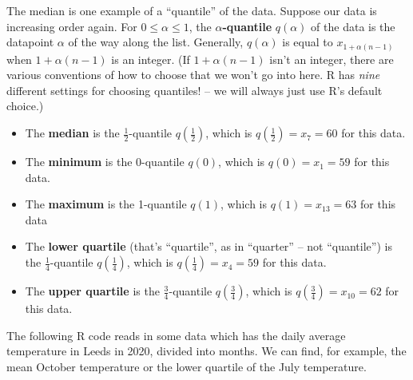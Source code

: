 \documentclass[
  a4paper,
]{book}
\newenvironment{Shaded}{\begin{snugshade}}{\end{snugshade}}
\newcommand{\FunctionTok}[1]{\textcolor[rgb]{0.13,0.29,0.53}{\textbf{#1}}}
\newcommand{\NormalTok}[1]{#1}
\newcommand{\OtherTok}[1]{\textcolor[rgb]{0.56,0.35,0.01}{#1}}
\newcommand{\SpecialCharTok}[1]{\textcolor[rgb]{0.81,0.36,0.00}{\textbf{#1}}}
\newcommand{\StringTok}[1]{\textcolor[rgb]{0.31,0.60,0.02}{#1}}
\providecommand{\tightlist}{%
  \setlength{\itemsep}{0pt}\setlength{\parskip}{0pt}}
\theoremstyle{definition}
\theoremstyle{definition}
\theoremstyle{definition}
\theoremstyle{definition}
\theoremstyle{remark}
\begin{document}
The median is one example of a ``quantile'' of the data. Suppose our data is increasing order again. For \(0 \leq \alpha \leq 1\), the \textbf{\(\alpha\)-quantile} \(q(\alpha)\) of the data is the datapoint \(\alpha\) of the way along the list. Generally, \(q(\alpha)\) is equal to \(x_{1+\alpha(n-1)}\) when \(1+\alpha(n-1)\) is an integer. (If \(1+\alpha(n-1)\) isn't an integer, there are various conventions of how to choose that we won't go into here. R has \emph{nine} different settings for choosing quantiles! -- we will always just use R's default choice.)

\begin{itemize}
\tightlist
\item
  The \textbf{median} is the \(\frac12\)-quantile \(q(\frac12)\), which is \(q(\frac12) = x_7 = 60\) for this data.
\item
  The \textbf{minimum} is the 0-quantile \(q(0)\), which is \(q(0) = x_1 = 59\) for this data.
\item
  The \textbf{maximum} is the 1-quantile \(q(1)\), which is \(q(1) = x_{13} = 63\) for this data
\item
  The \textbf{lower quartile} (that's ``quartile'', as in ``quarter'' -- not ``quantile'') is the \(\frac14\)-quantile \(q(\frac14)\), which is \(q(\frac14) = x_4 = 59\) for this data.
\item
  The \textbf{upper quartile} is the \(\frac34\)-quantile \(q(\frac34)\), which is \(q(\frac34) = x_{10} = 62\) for this data.
\end{itemize}

The following R code reads in some data which has the daily average temperature in Leeds in 2020, divided into months. We can find, for example, the mean October temperature or the lower quartile of the July temperature.

\begin{Shaded}
\end{Shaded}
\end{document}

